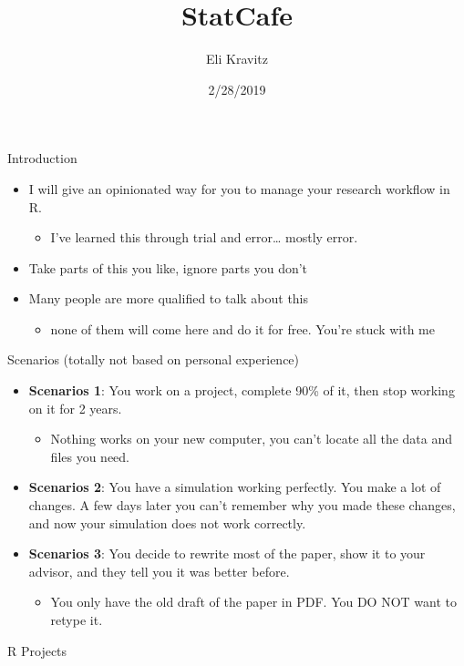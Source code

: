 \documentclass[ignorenonframetext,]{beamer}
\title{StatCafe}
\author{Eli Kravitz}
\date{2/28/2019}
\providecommand{\tightlist}{%
  \setlength{\itemsep}{0pt}\setlength{\parskip}{0pt}}
\begin{document}
\frame{\titlepage}

\begin{frame}{Introduction}
\protect\hypertarget{introduction}{}

\begin{itemize}
\item
  I will give an \alert{opinionated} way for you to manage your research
  workflow in R.

  \begin{itemize}
  \tightlist
  \item
    I’ve learned this through trial and error\ldots{} mostly error.
  \end{itemize}
\item
  Take parts of this you like, ignore parts you don’t
\item
  Many people are more qualified to talk about this

  \begin{itemize}
  \tightlist
  \item
    none of them will come here and do it for free. You’re stuck with me
  \end{itemize}
\end{itemize}

\end{frame}

\begin{frame}{Scenarios (totally not based on personal experience)}
\protect\hypertarget{scenarios-totally-not-based-on-personal-experience}{}

\begin{itemize}
\item
  \textbf{Scenarios 1}: You work on a project, complete 90\% of it, then
  stop working on it for 2 years.

  \begin{itemize}
  \tightlist
  \item
    \alert{Nothing works} on your new computer, you can’t locate all the
    data and files you need.
  \end{itemize}
\item
  \textbf{Scenarios 2}: You have a simulation working perfectly. You
  make a lot of changes. \alert{A few days later} you can’t remember why
  you made these changes, and now
  \alert{your simulation does not work correctly}.
\item
  \textbf{Scenarios 3}: You decide to rewrite most of the paper, show it
  to your advisor, and they tell you it was better before.

  \begin{itemize}
  \tightlist
  \item
    You only have the old draft of the paper in PDF. You DO NOT want to
    retype it.
  \end{itemize}
\end{itemize}

\end{frame}

\begin{frame}{R Projects}
\protect\hypertarget{r-projects}{}

\end{frame}
\end{document}
